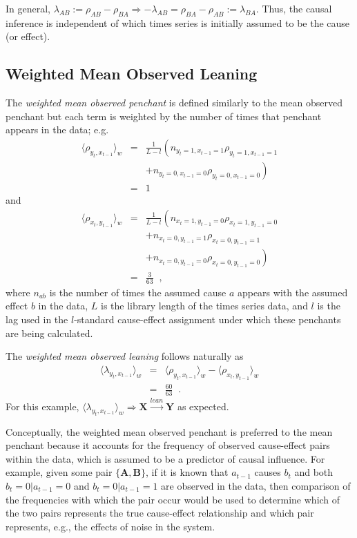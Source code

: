 \documentclass[a4paper,11pt,twocolumn]{article}
\begin{document}
In general, $\lambda_{AB} := \rho_{AB} - \rho_{BA}\Rightarrow -\lambda_{AB} = \rho_{BA} - \rho_{AB} := \lambda_{BA}$.  Thus, the causal inference is independent of which times series is initially assumed to be the cause (or effect).  

\subsection{Weighted Mean Observed Leaning}
\label{sec:wmean}
The {\em weighted mean observed penchant} is defined similarly to the mean observed penchant but each term is weighted by the number of times that penchant appears in the data; e.g.\
\begin{eqnarray*}
\langle \rho_{y_t,x_{t-1}} \rangle_w &=& \frac{1}{L-l}\left(n_{y_t=1,x_{t-1}=1}\rho_{y_t=1,x_{t-1}=1} \right.\\
& & \left.+ n_{y_t=0,x_{t-1}=0}\rho_{y_t=0,x_{t-1}=0}\right)\\
&=& 1
\end{eqnarray*}
and
\begin{eqnarray*}
\langle \rho_{x_t,y_{t-1}} \rangle_w &=& \frac{1}{L-l}\left(n_{x_t=1,y_{t-1}=0}\rho_{x_t=1,y_{t-1}=0} \right.\\
& & +n_{x_t=0,y_{t-1}=1}\rho_{x_t=0,y_{t-1}=1}\\
& & \left.+ n_{x_t=0,y_{t-1}=0}\rho_{x_t=0,y_{t-1}=0}\right)\\
&=& \frac{3}{63}\;\;,
\end{eqnarray*}
where $n_{ab}$ is the number of times the assumed cause $a$ appears with the assumed effect $b$ in the data, $L$ is the library length of the times series data, and $l$ is the lag used in the $l$-standard cause-effect assignment under which these penchants are being calculated.  

The {\em weighted mean observed leaning} follows naturally as
\begin{eqnarray*}
\langle \lambda_{y_t,x_{t-1}} \rangle_w &=& \langle \rho_{y_t,x_{t-1}} \rangle_w - \langle \rho_{x_t,y_{t-1}} \rangle_w\\
&=& \frac{60}{63}\;\;.
\end{eqnarray*}
For this example, $\langle \lambda_{y_t,x_{t-1}} \rangle_w\Rightarrow \mathbf{X}\xrightarrow{lean}\mathbf{Y}$ as expected.

Conceptually, the weighted mean observed penchant is preferred to the mean penchant because it accounts for the frequency of observed cause-effect pairs within the data, which is assumed to be a predictor of causal influence.  For example, given some pair $\{\mathbf{A},\mathbf{B}\}$, if it is known that $a_{t-1}$ causes $b_{t}$ and both $b_t = 0 | a_{t-1} = 0$ and $b_t = 0 | a_{t-1} = 1$ are observed in the data, then comparison of the frequencies with which the pair occur would be used to determine which of the two pairs represents the true cause-effect relationship and which pair represents, e.g., the effects of noise in the system.
\end{document}
